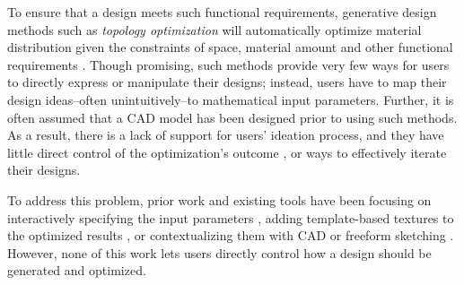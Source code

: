 To ensure that a design meets such functional requirements, generative design methods such as \textit{topology optimization}
will automatically optimize material distribution given the constraints of space, material amount and other functional requirements \cite{sigmund200199}.
Though promising, such methods provide very few ways for users to directly express or manipulate their designs; instead, users have to map their design ideas--often unintuitively--to mathematical input parameters. Further, it is often assumed that a CAD model has been designed prior to using such methods. As a result, there is a lack of support for users' ideation process, and they have little direct control of the optimization's outcome \cite{zhou2016direct}, or ways to effectively iterate their designs.

To address this problem, prior work and existing tools have been focusing on interactively specifying the input parameters \cite{aage2013interactive, Stressto43:online}, adding template-based textures to the optimized results \cite{martinez2015structure}, or contextualizing them with CAD \cite{shea2003towards} or freeform sketching \cite{kazi2017dreamsketch}. However, none of this work lets users directly control how a design should be generated and optimized.


